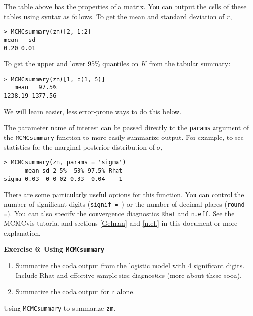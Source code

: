 \documentclass[12pt,english]{article}
\begin{document}
\noindent The table above has the properties of a matrix. You can output the cells of these tables using syntax as follows. To get the mean and standard deviation of $r$,

\begin{Verbatim}
> MCMCsummary(zm)[2, 1:2]
mean   sd 
0.20 0.01 
\end{Verbatim}

\noindent To get the upper and lower 95\% quantiles on $K$ from the tabular summary: 

\begin{Verbatim}
> MCMCsummary(zm)[1, c(1, 5)]
   mean   97.5% 
1238.19 1377.56
\end{Verbatim}
We will learn easier, less error-prone ways to do this below.

\noindent  The parameter name of interest can be passed directly to the \texttt{params} argument of the \texttt{MCMCsummary} function to more easily summarize output. For example, to see statistics for the marginal posterior distribution of $\sigma$,

\begin{Verbatim}
> MCMCsummary(zm, params = 'sigma')
      mean sd 2.5%  50% 97.5% Rhat
sigma 0.03  0 0.02 0.03  0.04    1
\end{Verbatim}

There are some particularly useful options for this function.  You can control the number of significant digits (\texttt{signif = }) or the number of decimal places (\texttt{round =}).  You can also specify the convergence diagnostics \texttt{Rhat} and \texttt{n.eff}.  See the MCMCvis tutorial and sections \ref{Gelman} and \ref{n.eff}  in this document or more explanation.

\bigskip
\belowcaptionskip=-20pt
\begin{exercise}
\begin{mdframed}
\doublespacing
\textbf{Exercise 6: Using \texttt{MCMCsummary}} 
\begin{enumerate}
\item Summarize the coda output from the logistic model with 4 significant digits.  Include Rhat and effective sample size diagnostics (more about these soon). 
\item Summarize the coda output for  \texttt{r} alone.  
\end{enumerate}
\end{mdframed}
\captionsetup{textformat=empty, labelformat=empty}
\caption[Using \texttt{MCMCsummary} to summarize \texttt{zm}]{Using \texttt{MCMCsummary} to summarize \texttt{zm}.}
\label{ex:MCMCsummary}
\end{exercise}
\belowcaptionskip=0pt
\end{document}
